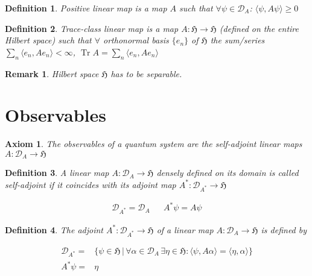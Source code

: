 \documentclass{article}
\newtheorem{axiom}{Axiom}
\newtheorem{definition}{Definition}
\newtheorem{remark}{Remark}
\DeclareMathOperator{\tr}{Tr}
\begin{document}
\begin{definition}
Positive linear map is a map $A$ such that $\forall\psi\in\mathcal{D}_A$: $\langle\psi, A\psi\rangle \geq 0$
\end{definition}

\begin{definition}
Trace-class linear map is a map $A:\mathfrak{H}\rightarrow\mathfrak{H}$ (defined on the entire Hilbert space) such that $\forall$ orthonormal basis $\{e_n\}$ of $\mathfrak{H}$ the sum/series $\sum_n \langle e_n, A e_n \rangle < \infty$, $\tr A = \sum_n \langle e_n, A e_n \rangle$
\end{definition}

\begin{remark}
Hilbert space $\mathfrak{H}$ has to be separable.
\end{remark}

\section{Observables}

\begin{axiom}
The observables of a quantum system are the self-adjoint linear maps $A:\mathcal{D}_A\longrightarrow\mathfrak{H}$
\end{axiom}

\begin{definition}
A linear map $A:\mathcal{D}_A\longrightarrow\mathfrak{H}$ densely defined on its domain is called self-adjoint if it coincides with its adjoint map $A^{*}:\mathcal{D}_{A^{*}}\longrightarrow\mathfrak{H}$
\end{definition}

\begin{align*}
\mathcal{D}_{A^{*}} = \mathcal{D}_A & & A^{*}\psi = A\psi
\end{align*}

\begin{definition}
The adjoint $A^{*}:\mathcal{D}_{A^{*}}\longrightarrow\mathfrak{H}$ of a linear map $A:\mathcal{D}_A\longrightarrow\mathfrak{H}$ is defined by

\begin{align*}
\mathcal{D}_{A^{*}} = & \Big\{ \psi \in \mathfrak{H} \,\Big\vert\, \forall\alpha\in\mathcal{D}_A \,\exists\eta\in\mathfrak{H}: \langle\psi,A\alpha\rangle = \langle\eta,\alpha\rangle \Big\} \\
A^{*}\psi = & \eta
\end{align*}

\end{definition}
\end{document}
